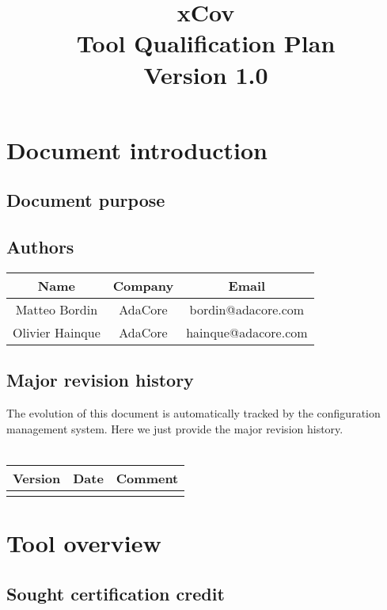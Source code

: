 \documentclass {report}
\begin{document}
\title{xCov\\Tool Qualification Plan\\Version 1.0}

\maketitle

\tableofcontents

\chapter{Document introduction}

\section{Document purpose}

\section{Authors}
\begin{tabular}{|c|c|c|}
\hline
\textbf{Name} & \textbf{Company} & \textbf{Email} \\ \hline
Matteo Bordin & AdaCore & bordin@adacore.com \\ \hline
Olivier Hainque & AdaCore & hainque@adacore.com \\ \hline
\end{tabular}

\section{Major revision history}
The evolution of this document is automatically tracked by the configuration management system. Here we just provide the major revision history.
\ \\ \\
\begin{tabular}{|c|c|c|}
\hline
\textbf{Version} & \textbf{Date} & \textbf{Comment} \\ \hline
 &  &  \\ \hline
\end{tabular}



\chapter{Tool overview}
\section {Sought certification credit}
\end{document}

